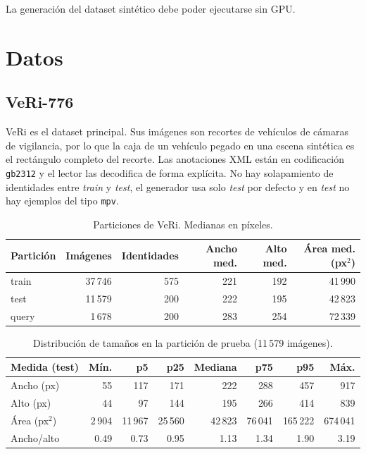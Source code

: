 \documentclass[11pt,a4paper]{article}
\begin{document}
La generaci\'on del dataset sint\'etico debe poder ejecutarse sin GPU.

\section{Datos}

\subsection{VeRi-776}

VeRi es el dataset principal. Sus im\'agenes son recortes de veh\'iculos de c\'amaras de
vigilancia, por lo que la caja de un veh\'iculo pegado en una escena sint\'etica es el
rect\'angulo completo del recorte. Las anotaciones XML est\'an en codificaci\'on
\texttt{gb2312} y el lector las decodifica de forma expl\'icita. No hay solapamiento de
identidades entre \emph{train} y \emph{test}, el generador usa solo \emph{test} por defecto
y en \emph{test} no hay ejemplos del tipo \texttt{mpv}.

\begin{table}[ht]
\centering
\begin{tabular}{@{}lrrrrr@{}}
\toprule
Partici\'on & Im\'agenes & Identidades & Ancho med. & Alto med. & \'Area med. (px$^2$) \\
\midrule
train & 37\,746 & 575 & 221 & 192 & 41\,990 \\
test  & 11\,579 & 200 & 222 & 195 & 42\,823 \\
query &  1\,678 & 200 & 283 & 254 & 72\,339 \\
\bottomrule
\end{tabular}
\caption{Particiones de VeRi. Medianas en p\'ixeles.}
\end{table}

\begin{table}[ht]
\centering
\begin{tabular}{@{}lrrrrrrr@{}}
\toprule
Medida (test) & M\'in. & p5 & p25 & Mediana & p75 & p95 & M\'ax. \\
\midrule
Ancho (px)   & 55 & 117 & 171 & 222 & 288 & 457 & 917 \\
Alto (px)    & 44 & 97 & 144 & 195 & 266 & 414 & 839 \\
\'Area (px$^2$) & 2\,904 & 11\,967 & 25\,560 & 42\,823 & 76\,041 & 165\,222 & 674\,041 \\
Ancho/alto   & 0.49 & 0.73 & 0.95 & 1.13 & 1.34 & 1.90 & 3.19 \\
\bottomrule
\end{tabular}
\caption{Distribuci\'on de tama\~nos en la partici\'on de prueba (11\,579 im\'agenes).}
\end{table}
\end{document}
